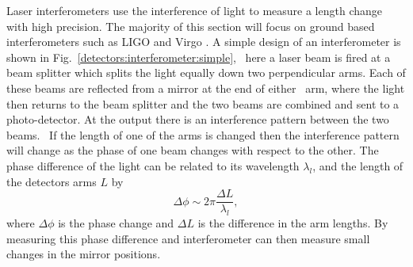 Laser interferometers use the interference of light to measure a
length change with high precision.  The majority of this
section will focus on ground based interferometers such as \gls{LIGO} and Virgo
\citep{aasi2015AdvancedLIGO,acernese2015AdvancedVirgo}.  A simple design of an
interferometer is shown in
Fig.~\ref{detectors:interferometer:simple},~ here a laser
beam is fired at a beam splitter which splits the light equally down two
perpendicular arms.  Each of these beams are reflected from a mirror at the end
of either~ arm, where the light then returns to the beam splitter and the two beams
are combined and sent to a photo-detector.  At the output there is an
interference pattern between the two beams.~ If the length of one of the arms
is changed then the interference pattern will change as the phase of one beam
changes with respect to the other.  The phase difference of the light can be
related to its wavelength $\lambda_l$, and the length of the
detectors arms $L$ by
%
\begin{equation}
\label{intro:detectors:phasechange}
\Delta \phi \sim 2 \pi \frac{\Delta L}{\lambda_l},
\end{equation}
%
where $\Delta \phi$ is the phase change and $\Delta L$ is the difference in the
arm lengths.  By measuring this phase difference and interferometer can then
measure small changes in the mirror positions.

